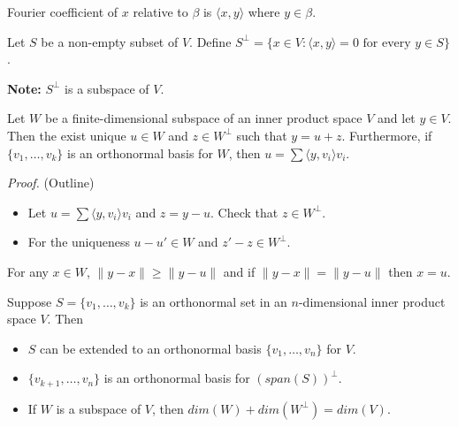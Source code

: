 \documentclass[12pt]{article}
\newenvironment{theorem}[2][Theorem]{\begin{trivlist}
\item[\hskip \labelsep {\bfseries #1}\hskip \labelsep {\bfseries #2.}]}{\end{trivlist}}
\newenvironment{corollary}[2][Corollary]{\begin{trivlist}
\item[\hskip \labelsep {\bfseries #1}\hskip \labelsep {\bfseries #2}]}{\end{trivlist}}
\newenvironment{definition}[2][Definition]{\begin{trivlist}
\item[\hskip \labelsep {\bfseries #1}\hskip \labelsep {\bfseries #2}]}{\end{trivlist}}
\begin{document}
\noindent Fourier coefficient of $x$ relative to $\beta$ is $\langle x, y \rangle$ where $y \in \beta$.

\begin{definition}{6}
Let $S$ be a non-empty subset of $V$. Define $S^\perp = \{x \in V : \langle x, y \rangle = 0 \text{ for every } y \in S\}$.
\end{definition}

\noindent\textbf{Note:} $S^\perp$ is a subspace of $V$.

\begin{theorem}{6.6}
Let $W$ be a finite-dimensional subspace of an inner product space $V$ and let $y \in V$. Then the exist unique $u \in W$ and $z \in W^\perp$ such that $y = u + z$. Furthermore, if $\{v_1, \dots, v_k\}$ is an orthonormal basis for $W$, then $u = \sum \langle y, v_i \rangle v_i$. 
\end{theorem}

\textit{Proof.} (Outline)

\begin{itemize}
    \item Let $u = \sum \langle y, v_i \rangle v_i$ and $z = y - u$. Check that $z \in W^\perp$.
    
    \item For the uniqueness $u - u' \in W$ and $z' - z \in W^\perp$.
\end{itemize}

\begin{corollary}{9}
For any $x \in W$, $\lVert y - x \rVert \geq \lVert y - u \rVert$ and if $\lVert y - x \rVert = \lVert y - u \rVert$ then $x = u$.
\end{corollary}

\begin{theorem}{6.7}
Suppose $S = \{v_1, \dots, v_k\}$ is an orthonormal set in an $n$-dimensional inner product space $V$. Then 

\begin{itemize}
    \item[(a)] $S$ can be extended to an orthonormal basis $\{v_1, \dots, v_n\}$ for $V$.
    
    \item[(b)] $\{v_{k+1}, \dots, v_n\}$ is an orthonormal basis for $(span(S))^\perp$.
    
    \item[(c)] If $W$ is a subspace of $V$, then $dim(W) + dim(W^\perp) = dim(V)$.
\end{itemize}
\end{theorem}
\end{document}
